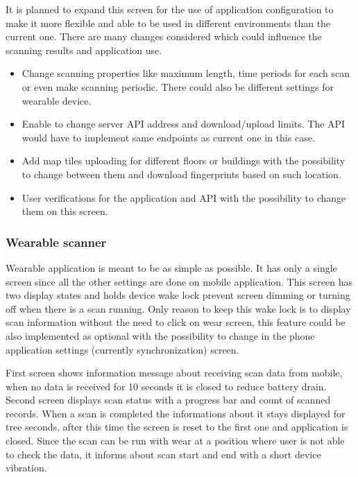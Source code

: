 It is planned to expand this screen for the use of application configuration to make it more flexible and able to be used in different environments than the current one. There are many changes considered which could influence the scanning results and application use.

\begin{itemize}
	\item Change scanning properties like maximum length, time periods for each scan or even make scanning periodic. There could also be different settings for wearable device.
	\item Enable to change server API address and download/upload limits. The API would have to implement same endpoints as current one in this case.
	\item Add map tiles uploading for different floors or buildings with the possibility to change between them and download fingerprints based on such location.
	\item User verifications for the application and API with the possibility to change them on this screen.
\end{itemize}

\subsubsection{Wearable scanner}\label{subsec:WearableScanner}
Wearable application is meant to be as simple as possible. It has only a single screen since all the other settings are done on mobile application. This screen has two display states and holds device wake lock prevent screen dimming or turning off when there is a scan running. Only reason to keep this wake lock is to display scan information without the need to click on wear screen, this feature could be also implemented as optional with the possibility to change in the phone application settings (currently synchronization) screen. 


First screen shows information message about receiving scan data from mobile, when no data is received for 10 seconds it is closed to reduce battery drain. Second screen displays scan status with a progress bar and count of scanned records. When a scan is completed the informations about it stays displayed for tree seconds, after this time the screen is reset to the first one and application is closed. Since the scan can be run with wear at a position where user is not able to check the data, it informs about scan start and end with a short device vibration.